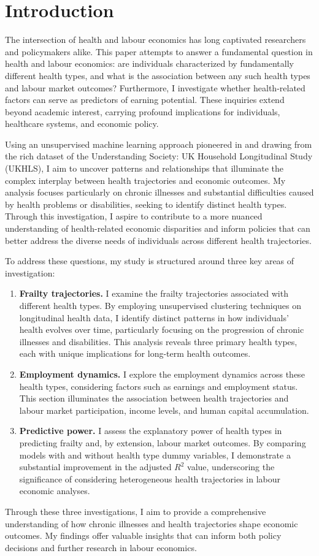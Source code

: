 \section{Introduction}
The intersection of health and labour economics has long captivated researchers and policymakers alike. This paper attempts to answer a fundamental question in health and labour economics: are individuals characterized by fundamentally different health types, and what is the association between any such health types and labour market outcomes? Furthermore, I investigate whether health-related factors can serve as predictors of earning potential. These inquiries extend beyond academic interest, carrying profound implications for individuals, healthcare systems, and economic policy.

Using an unsupervised machine learning approach pioneered in \citet{denardi2024wp} and drawing from the rich dataset of the Understanding Society: UK Household Longitudinal Study (UKHLS), I aim to uncover patterns and relationships that illuminate the complex interplay between health trajectories and economic outcomes. My analysis focuses particularly on chronic illnesses and substantial difficulties caused by health problems or disabilities, seeking to identify distinct health types. Through this investigation, I aspire to contribute to a more nuanced understanding of health-related economic disparities and inform policies that can better address the diverse needs of individuals across different health trajectories.

To address these questions, my study is structured around three key areas of investigation:
\begin{enumerate}
    \item \textbf{Frailty trajectories.} I examine the frailty trajectories associated with different health types. By employing unsupervised clustering techniques on longitudinal health data, I identify distinct patterns in how individuals' health evolves over time, particularly focusing on the progression of chronic illnesses and disabilities. This analysis reveals three primary health types, each with unique implications for long-term health outcomes.
    \item \textbf{Employment dynamics.} I explore the employment dynamics across these health types, considering factors such as earnings and employment status. This section illuminates the association between health trajectories and labour market participation, income levels, and human capital accumulation.
    \item \textbf{Predictive power.} I assess the explanatory power of health types in predicting frailty and, by extension, labour market outcomes. By comparing models with and without health type dummy variables, I demonstrate a substantial improvement in the adjusted $R^2$ value, underscoring the significance of considering heterogeneous health trajectories in labour economic analyses.
\end{enumerate}

Through these three investigations, I aim to provide a comprehensive understanding of how chronic illnesses and health trajectories shape economic outcomes. My findings offer valuable insights that can inform both policy decisions and further research in labour economics.
